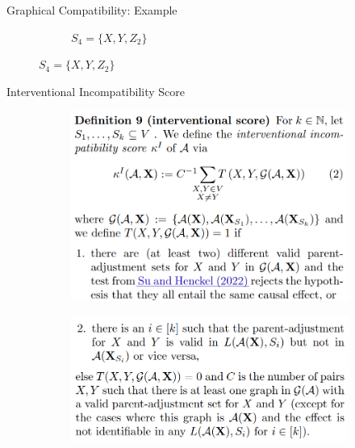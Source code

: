 \documentclass{beamer}
\begin{document}
\begin{frame}{Graphical Compatibility: Example}
\begin{figure}
\begin{subfigure}{0.23 \textwidth}
			\caption*{$S_4 = \{ X, Y, Z_2 \} $}
		\end{subfigure}
	\end{figure}

	\vspace{0.5em}
\end{frame}

\begin{frame}{Interventional Incompatibility Score}
	\begin{figure}
		\begin{subfigure}{\textwidth}
			\centering
			\includegraphics[scale=0.23]{imgs/def_9_1.png}
		\end{subfigure}
		\begin{subfigure}{\textwidth}
			\centering
			\includegraphics[scale=0.23]{imgs/def_9_2.png}
		\end{subfigure}
	\end{figure}
\end{frame}
\end{document}
